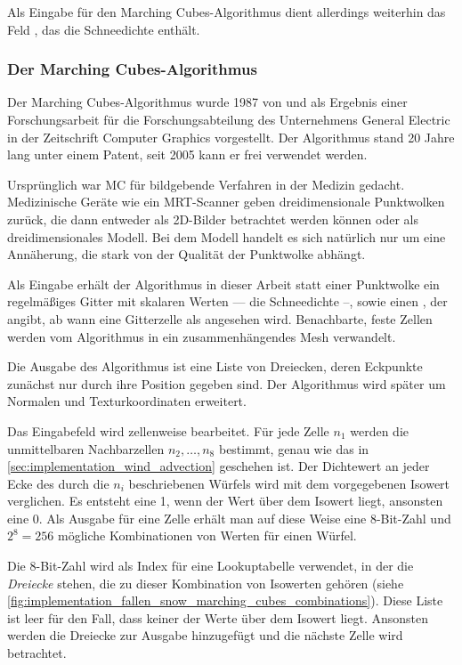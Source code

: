 Als Eingabe für den Marching Cubes-Algorithmus dient allerdings
weiterhin das Feld , das die
Schneedichte enthält.

\subsubsection{Der Marching Cubes-Algorithmus}

Der Marching Cubes-Algorithmus wurde 1987 von
 und 
als Ergebnis einer Forschungsarbeit für die Forschungsabteilung des
Unternehmens General Electric in der Zeitschrift Computer Graphics
vorgestellt\cite{Lorensen:1987:MCH:37402.37422}. Der Algorithmus stand
20 Jahre lang unter einem Patent, seit 2005 kann er frei verwendet
werden.

Ursprünglich war MC für bildgebende Verfahren in der Medizin
gedacht. Medizinische Geräte wie ein MRT-Scanner geben
dreidimensionale Punktwolken zurück, die dann entweder
 als 2D-Bilder betrachtet werden können
oder als dreidimensionales Modell. Bei dem Modell handelt es sich
natürlich nur um eine Annäherung, die stark von der Qualität der
Punktwolke abhängt.

Als Eingabe erhält der Algorithmus in dieser Arbeit statt einer
Punktwolke ein regelmäßiges Gitter mit skalaren Werten --- \PimiddyzB
die Schneedichte --, sowie einen , der angibt,
ab wann eine Gitterzelle als  angesehen wird.
Benachbarte, feste Zellen werden vom Algorithmus in ein
zusammenhängendes Mesh verwandelt.

Die Ausgabe des Algorithmus ist eine Liste von Dreiecken, deren
Eckpunkte zunächst nur durch ihre Position gegeben sind. Der
Algorithmus wird später um Normalen und Texturkoordinaten erweitert.

Das Eingabefeld wird zellenweise bearbeitet. Für jede Zelle $n_1$
werden die unmittelbaren Nachbarzellen $n_2,\ldots,n_8$ bestimmt,
genau wie das in \cref{sec:implementation_wind_advection} geschehen
ist. Der Dichtewert an jeder Ecke des durch die $n_i$ beschriebenen
Würfels wird mit dem vorgegebenen Isowert verglichen. Es entsteht eine
1, wenn der Wert über dem Isowert liegt, ansonsten eine 0. Als Ausgabe
für eine Zelle erhält man auf diese Weise eine 8-Bit-Zahl und
$2^8=256$ mögliche Kombinationen von Werten für einen Würfel.

Die 8-Bit-Zahl wird als Index für eine Lookuptabelle verwendet, in der
die \emph{Dreiecke} stehen, die zu dieser Kombination von Isowerten
gehören (siehe
\cref{fig:implementation_fallen_snow_marching_cubes_combinations}). Diese
Liste ist leer für den Fall, dass keiner der Werte über dem Isowert
liegt. Ansonsten werden die Dreiecke zur Ausgabe hinzugefügt und die
nächste Zelle wird betrachtet.

